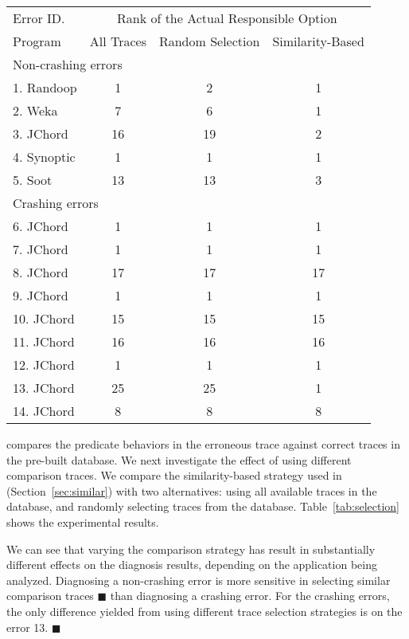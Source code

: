 \begin{table}[t]
\setlength{\tabcolsep}{.24\tabcolsep}
\begin{tabular}{|l|c|c||c|}
\hline
 Error ID. & \multicolumn{3}{|c|}{Rank of the Actual Responsible Option } \\
\cline{2-4}
 Program & All Traces & Random Selection&  Similarity-Based\\
 \hline
\hline
\multicolumn{4}{|l|}{Non-crashing errors}   \\
 \hline
 1. Randoop & 1 & 2 & 1\\
 2. Weka & 7 & 6 & 1\\
 3. JChord & 16 & 19 & 2\\
 4. Synoptic & 1 & 1 & 1\\
 5. Soot & 13 & 13 & 3\\
\hline
\hline
\multicolumn{4}{|l|}{Crashing errors}   \\
\hline
 6. JChord & 1 & 1 &1\\
 7. JChord & 1 & 1 &1\\
 8. JChord & 17 & 17 &17\\
 9. JChord & 1 &  1&1\\
 10. JChord & 15 & 15 &15\\
 11. JChord & 16 & 16 &16\\
 12. JChord & 1 & 1 &1\\
 13. JChord & 25 & 25 &1\\
 14. JChord & 8 & 8 &8\\
\hline
\end{tabular}

\end{table}


\ourtool compares the predicate behaviors in the erroneous trace against
correct traces in the pre-built database.
We next investigate the effect of using different comparison
traces. We compare the similarity-based strategy used in \ourtool
 (Section~\ref{sec:similar}) with two alternatives: using all
available traces in the database, and randomly selecting
traces from the database. Table~\ref{tab:selection} shows the experimental results.

We can see that varying the comparison strategy has result in
substantially different effects on the diagnosis results,
depending on the application being analyzed. Diagnosing
a non-crashing error is more sensitive in selecting similar
comparison traces $\blacksquare$ than diagnosing
a crashing error.
For the \crash crashing errors, the only difference yielded
from using different trace selection strategies is on
the error 13. $\blacksquare$



